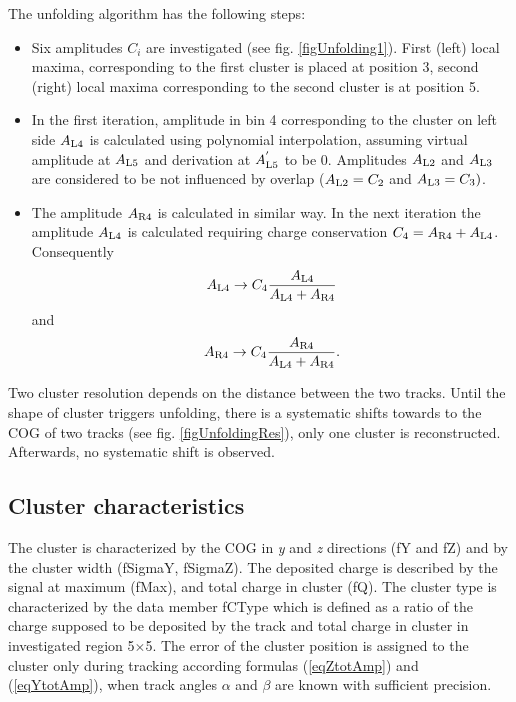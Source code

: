 \documentclass[a4paper,12pt]{article}
\begin{document}
The unfolding algorithm has the following steps:
\begin{itemize}

\item Six amplitudes $C_i$ are investigated (see fig.
\ref{figUnfolding1}). First (left) local maxima, corresponding to
the first cluster is placed at position 3, second (right) local
maxima corresponding to the second cluster is at position 5.

\item In the first iteration, amplitude in bin 4 corresponding to
the cluster on left side $A_{\rm{L4}}$ is calculated using
polynomial interpolation, assuming virtual amplitude at
$A_{\rm{L5}}$ and derivation at $A_{\rm{L5}}^{'}$ to be 0.
Amplitudes $A_{\rm{L2}}$ and $A_{\rm{L3}}$ are considered to be
not influenced by overlap ($A_{\rm{L2}}=C_2$ and
$A_{\rm{L3}}=C_3)$.

\item The amplitude $A_{\rm{R4}}$ is calculated in similar way. In
the next iteration the amplitude $A_{\rm{L4}}$ is calculated
requiring charge conservation
$C_{\rm{4}}=A_{\rm{R4}}+A_{\rm{L4}}$. Consequently
\begin{eqnarray}
   A_{\rm{L4}} \rightarrow
   C_{\rm{4}}\frac{A_{\rm{L4}}}{A_{\rm{L4}}+A_{\rm{R4}}}
\end{eqnarray}
and
\begin{eqnarray}
   A_{\rm{R4}} \rightarrow
   C_{\rm{4}}\frac{A_{\rm{R4}}}{A_{\rm{L4}}+A_{\rm{R4}}}.
\end{eqnarray}
\end{itemize}


Two cluster resolution depends on the distance between the two
tracks. Until  the shape of cluster triggers unfolding, there is a
systematic shifts towards to the COG of two tracks (see fig.
\ref{figUnfoldingRes}), only one cluster is reconstructed.
Afterwards, no systematic shift is observed.


\subsection{Cluster characteristics}

The cluster is characterized by the COG in {\it{y}} and {\it{z}}
directions (fY and fZ) and  by the cluster width (fSigmaY,
fSigmaZ). The deposited charge is described by the signal at
maximum (fMax), and total charge in cluster (fQ). The cluster type
is characterized by the data member fCType which is defined as a
ratio of the charge supposed to be deposited by the track and
total charge in cluster in investigated region 5$\times$5. The
error of the cluster position is assigned to the cluster only
during tracking according formulas
 (\ref{eqZtotAmp}) and  (\ref{eqYtotAmp}), when track
 angles $\alpha$ and $\beta$ are known with sufficient precision.
\end{document}
